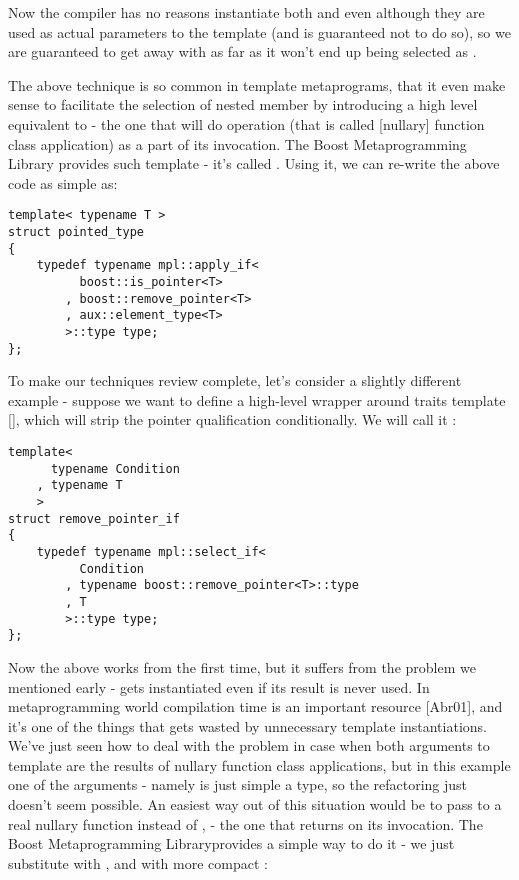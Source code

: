 \documentclass{kapproc}
\newcommand{\Mpl}{Boost Meta\-pro\-gram\-ming Library}
\begin{document}
Now the compiler has no reasons instantiate both 
 and 
 even although they are used as 
actual parameters to the  template (and is 
guaranteed not to do so), so we are guaranteed to get away with 
 as far as it won't end up being 
selected as .

The above technique is so common in template metaprograms, that it
even make sense to facilitate the selection of nested  member
by introducing a high level equivalent to  - the one
that will do  operation (that is called [nullary]
function class application) as a part of its invocation.  The \Mpl
provides such template - it's called . Using it, we
can re-write the above code as simple as:

{\small
\begin{codesamp}\begin{verbatim}
template< typename T >
struct pointed_type
{
    typedef typename mpl::apply_if<
          boost::is_pointer<T>
        , boost::remove_pointer<T>
        , aux::element_type<T>
        >::type type;
};
\end{verbatim}
\end{codesamp}
}

To make our techniques review complete, let's consider a slightly 
different example - suppose we want to define a high-level wrapper 
around  traits template [], which will 
strip the pointer qualification conditionally. We will call it 
:

{\small
\begin{codesamp}\begin{verbatim}
template<
      typename Condition
    , typename T
    >
struct remove_pointer_if
{
    typedef typename mpl::select_if<
          Condition
        , typename boost::remove_pointer<T>::type
        , T
        >::type type;
};
\end{verbatim}
\end{codesamp}
}

Now the above works from the first time, but it suffers from the 
problem we mentioned early -  gets 
instantiated even if its result is never used. In metaprogramming 
world compilation time is an important resource [Abr01], and it's 
one of the things that gets wasted by unnecessary template 
instantiations. We've just seen how to deal with the problem in 
case when both arguments to  template are the 
results of nullary function class applications, but in this example 
one of the arguments - namely  is just simple a type, so 
the refactoring just doesn't seem possible. An easiest way out of 
this situation would be to pass to  a real 
nullary function instead of , - the one that returns 
 on its invocation. The \Mpl provides a simple way to do it -
we just substitute  with ,
and  with more compact 
:
\end{document}
